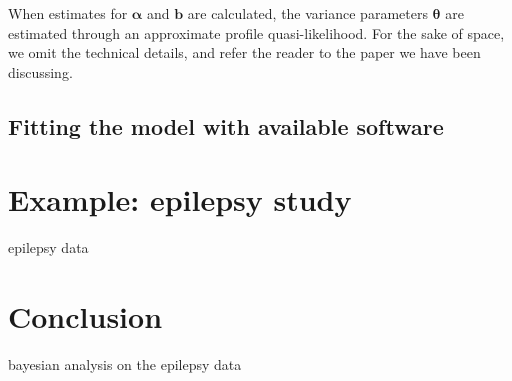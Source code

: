 \documentclass[12pt]{article}
\newcommand{\m}[1]{\mathbf{\bm{#1}}}
\begin{document}
When estimates for $\m{\alpha}$ and $\m{b}$ are calculated, the variance parameters $\m{\theta}$ are estimated through an approximate profile quasi-likelihood. For the sake of space, we omit the technical details, and refer the reader to the paper we have been discussing.




\subsection{Fitting the model with available software}

\section{Example: epilepsy study}

epilepsy data \cite{thall:1990}

\section{Conclusion}

bayesian analysis on the epilepsy data \cite{fong:2009}



\end{document}
